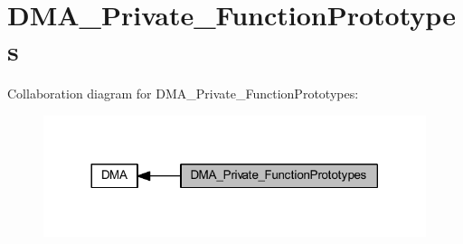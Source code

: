\hypertarget{group___d_m_a___private___function_prototypes}{}\section{D\+M\+A\+\_\+\+Private\+\_\+\+Function\+Prototypes}
\label{group___d_m_a___private___function_prototypes}
Collaboration diagram for D\+M\+A\+\_\+\+Private\+\_\+\+Function\+Prototypes\+:
\nopagebreak
\begin{figure}[H]
\begin{center}
\leavevmode
\includegraphics[width=317pt]{group___d_m_a___private___function_prototypes}
\end{center}
\end{figure}
